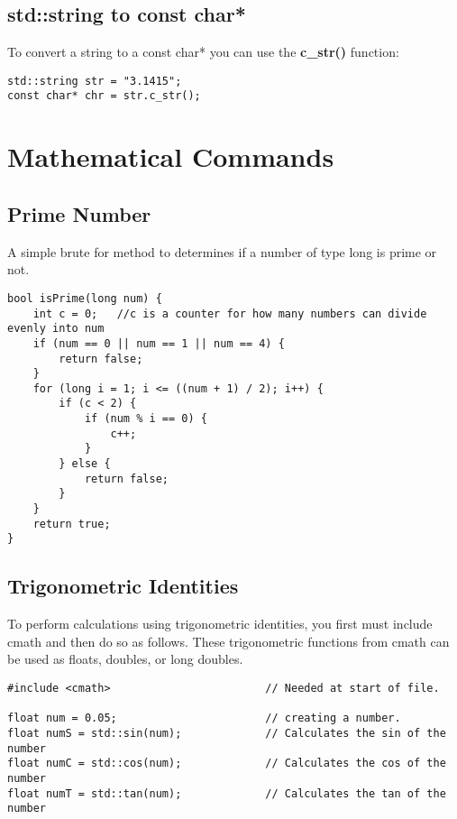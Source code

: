 \subsection*{std::string to const char*}
To convert a string to a const char* you can use the \textbf{c\_str()} function:
\begin{lstlisting}
std::string str = "3.1415";
const char* chr = str.c_str();
\end{lstlisting}

















\section{Mathematical Commands}

\subsection*{Prime Number}
A simple brute for method to determines if a number of type long is prime or not.
\begin{lstlisting}
bool isPrime(long num) {  
	int c = 0;   //c is a counter for how many numbers can divide evenly into num
	if (num == 0 || num == 1 || num == 4) {
		return false;
	}
	for (long i = 1; i <= ((num + 1) / 2); i++) {
		if (c < 2) {
			if (num % i == 0) {
				c++;
			}
		} else {
			return false;
		}
	}
	return true;
}
\end{lstlisting}

\subsection*{Trigonometric Identities}
To perform calculations using trigonometric identities, you first must include cmath and then do so as follows. These trigonometric functions from cmath can be used as floats, doubles, or long doubles.
\begin{lstlisting}
#include <cmath>                        // Needed at start of file.

float num = 0.05;                       // creating a number.
float numS = std::sin(num);             // Calculates the sin of the number
float numC = std::cos(num);             // Calculates the cos of the number
float numT = std::tan(num);             // Calculates the tan of the number
\end{lstlisting}













